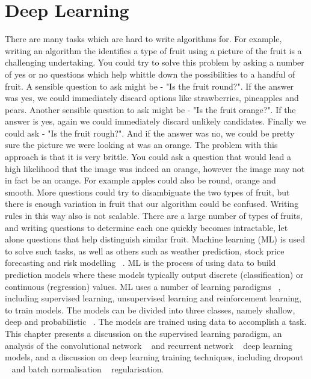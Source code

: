
\chapter{Deep Learning}

\ifpdf
     \graphicspath{{Figs/Chapter2/}}
\else
    \graphicspath{{Chapter2/Figs/Vector/}{Chapter2/Figs/}}
\fi

There are many tasks which are hard to write algorithms for. For example, writing an algorithm the identifies a type of fruit using a picture of the fruit is a challenging undertaking. You could try to solve this problem by asking a number of yes or no questions which help whittle down the possibilities to a handful of fruit. A sensible question to ask might be - "Is the fruit round?". If the answer was yes, we could immediately discard options like strawberries, pineapples and pears. Another sensible question to ask might be - "Is the fruit orange?". If the answer is yes, again we could immediately discard unlikely candidates. Finally we could ask - "Is the fruit rough?". And if the answer was no, we could be pretty sure the picture we were looking at was an orange. \newline
The problem with this approach is that it is very brittle. You could ask a question that would lead a high likelihood that the image was indeed an orange, however the image may not in fact be an orange. For example apples could also be round, orange and smooth. More questions could try to disambiguate the two types of fruit, but there is enough variation in fruit that our algorithm could be confused. Writing rules in this way also is not scalable. There are a large number of types of fruits, and writing questions to determine each one quickly becomes intractable, let alone questions that help distinguish similar fruit. \newline 
Machine learning (ML) is used to solve such tasks, as well as others such as weather prediction, stock price forecasting and risk modelling ~\citep{hastie2009elements}. ML is the process of using data to build prediction models where these models typically output discrete (classification) or continuous (regression) values. ML uses a number of learning paradigms ~\citep{murphy2012machine}, including supervised learning, unsupervised learning and reinforcement learning, to train models. The models can be divided into three classes, namely shallow, deep and probabilistic ~\citep{hastie2009elements, murphy2012machine}. The models are trained using data to accomplish a task. \newline
\newpage
This chapter presents a discussion on the supervised learning paradigm, an analysis of the convolutional network ~\citep{lecun1998gradient} and recurrent network ~\citep{werbos1988generalization} deep learning models, and a discussion on deep learning training techniques, including dropout ~\citep{srivastava2014dropout} and batch normalisation ~\citep{ioffe2015batch} regularisation. 


